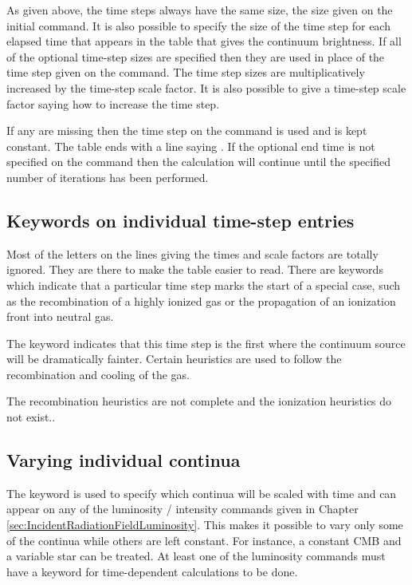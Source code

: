 \begin{shaded}
As given above, the time steps always have the same size, the size given
on the initial  command.
It is also possible to specify the size
of the time step for each elapsed time that appears in the
table that gives the continuum brightness.
If all of the optional time-step sizes are
specified then they are used in place of the time step given on the
 command.
The time step sizes are multiplicatively increased by the time-step
scale factor.
It is also possible to give a time-step scale factor saying
how to increase the time step.

If any are missing then the time step on the command is used and is kept
constant.
The table ends with a line saying .
If the optional end
time is not specified on the  command
then the calculation will continue
until the specified number of iterations has been performed.

\subsection{Keywords on individual time-step entries}

Most of the letters on the lines giving the times and scale factors are
totally ignored.  They are there to make the table easier to read.  There
are keywords which indicate that a particular time step marks the start
of a special case, such as the recombination of a highly ionized gas or
the propagation of an ionization front into neutral gas.

The keyword  indicates that
this time step is the first
where the continuum source will be dramatically fainter.
Certain heuristics
are used to follow the recombination and cooling of the gas.

The recombination heuristics are not complete
and the ionization heuristics do not exist..

\subsection{Varying individual continua}

The keyword  is used to specify which continua
will be scaled with
time and can appear on any of the luminosity / intensity commands given
in Chapter \ref{sec:IncidentRadiationFieldLuminosity}.
This makes it possible to vary only some of the continua
while others are left constant.
For instance, a constant CMB and a variable
star can be treated.
At least one of the luminosity commands must have
a  keyword for time-dependent calculations to be done.


\end{shaded}
